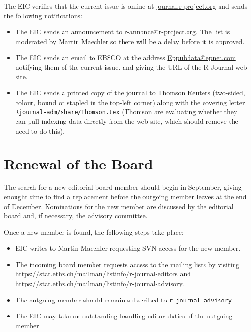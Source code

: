 \documentclass[11pt]{article}
\begin{document}
The EIC verifies that the current issue is online at
\url{journal.r-project.org} and sends the following notifications:
\begin{itemize}
\item The EIC sends an announcement to
  \url{r-annonce@r-project.org}. The list is moderated by Martin
  Maechler so there will be a delay before it is approved.
\item The EIC sends an email to EBSCO at the address 
  \url{Eppubdata@epnet.com} notifying them of the current issue.
  and giving the URL of the R Journal web site.
\item The EIC sends a printed copy of the journal to Thomson Reuters
  (two-sided, colour, bound or stapled in the top-left corner) along
  with the covering letter \texttt{Rjournal-adm/share/Thomson.tex}
  (Thomson are evaluating whether they can pull indexing data directly
  from the web site, which should remove the need to do this).
\end{itemize}

\section{Renewal of the Board}

The search for a new editorial board member should begin in September,
giving enought time to find a replacement before the outgoing member
leaves at the end of December.  Nominations for the new member are
discussed by the editorial board and, if necessary, the advisory
committee.

Once a new member is found, the following steps take place:
\begin{itemize}
\item EIC writes to Martin Maechler requesting SVN access for the new member.
\item The incoming board member requests access to the mailing lists by
visiting \url{https://stat.ethz.ch/mailman/listinfo/r-journal-editors}
and \url{https://stat.ethz.ch/mailman/listinfo/r-journal-advisory}.
\item The outgoing member should remain subscribed to \verb+r-journal-advisory+
\item The EIC may take on outstanding handling editor duties of the
  outgoing member
\end{itemize}
\end{document}

